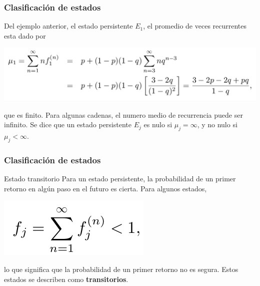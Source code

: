 \documentclass[spanish]{beamer}
\begin{document}
\begin{frame}
\frametitle{Clasificación de estados}
Del ejemplo anterior, el estado persistente $E_{1}$, el promedio de veces recurrentes esta dado por 


\begin{center}
\includegraphics[scale=0.3]{im43}
\end{center}
que es finito. Para algunas cadenas, el numero medio de recurrencia puede ser infinito. Se dice que un estado persistente $E_j$ es nulo si $\mu_j = \infty$, y no nulo si $\mu_j < \infty$. 
\end{frame}

\begin{frame}
\frametitle{Clasificación de estados}

\begin{block}{Estado transitorio}
Para un estado persistente, la probabilidad de un primer retorno en algún paso en el futuro es cierta. Para algunos estados,
\begin{center}
\includegraphics[scale=0.4]{im44}
\end{center}

lo que significa que la probabilidad de un primer retorno no es segura. Estos estados se describen como \textbf{transitorios}.
\end{block}

\end{frame}
\end{document}

